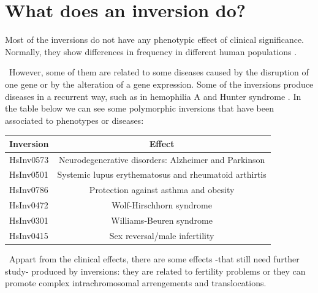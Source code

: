 \documentclass{article}
\begin{document}
\section{What does an inversion do?}
Most of the inversions do not have any phenotypic effect of clinical significance. Normally, they show differences in frequency in different human populations \cite{puig_human_2015}. 

\
However, some of them are related to some diseases caused by the disruption of one gene or by the alteration of a gene expression. Some of the inversions produce diseases in a recurrent way, such as in hemophilia A and Hunter syndrome \cite{puig_human_2015}. In the table below we can see some polymorphic inversions that have been associated to phenotypes or diseases:

\begin{table}[!htb] %
\begin{tabular}{|l|c|}
\hline
\multicolumn{1}{|c|}{\textbf{Inversion}} & \textbf{Effect}                                       \\ \hline
\multicolumn{1}{|c|}{HsInv0573}          & Neurodegenerative disorders: Alzheimer and Parkinson  \\ \hline
HsInv0501                                & Systemic lupus erythematosus and rheumatoid arthirtis \\ \hline
HsInv0786                                & Protection against asthma and obesity                 \\ \hline
HsInv0472                                & Wolf-Hirschhorn syndrome                              \\ \hline
HsInv0301                                & Williams-Beuren syndrome                              \\ \hline
HsInv0415                                & Sex reversal/male infertility                         \\ \hline
\end{tabular}
\end{table}

\
Appart from the clinical effects, there are some effects -that still need further study- produced by inversions: they are related to fertility problems or they can promote complex intrachromosomal arrengements and translocations. 
\newpage


\end{document}
